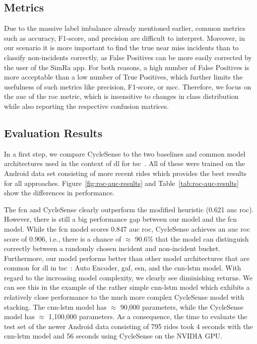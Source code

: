 \subsection{Metrics}
\label{subsec:metrics}
Due to the massive label imbalance already mentioned earlier, common metrics such as accuracy, F1-score, and precision are difficult to interpret.
Moreover, in our scenario it is more important to find the true near miss incidents than to classify non-incidents correctly, as False Positives can be more easily corrected by the user of the SimRa app.
For both reasons, a high number of False Positives is more acceptable than a low number of True Positives, which further limits the usefulness of such metrics like precision, F1-score, or \ac{mcc}.
Therefore, we focus on the \ac{auc} of the \ac{roc} metric, which is insensitive to changes in class distribution~\cite{fawcett2006introduction} while also reporting the respective confusion matrices.

\subsection{Evaluation Results}
\label{subsec:evaluation_results}
In a first step, we compare CycleSense to the two baselines and common model architectures used in the context of \ac{dl} for \ac{tsc}~\cite{ismail2019deep}.
All of these were trained on the Android data set consisting of more recent rides which provides the best results for all approaches.
Figure~\ref{fig:roc-auc-results} and Table~\ref{tab:roc-auc-results} show the differences in performance.

The \ac{fcn} and CycleSense clearly outperform the modified heuristic (0.621 \ac{auc} \ac{roc}).
However, there is still a big performance gap between our model and the \ac{fcn} model.
While the \ac{fcn} model scores 0.847 \ac{auc} \ac{roc}, CycleSense achieves an \ac{auc} \ac{roc} score of 0.906, i.e., there is a chance of $\approx$ 90.6\% that the model can distinguish correctly between a randomly chosen incident and non-incident bucket.
Furthermore, our model performs better than other model architectures that are common for \ac{dl} in \ac{tsc}~\cite{ismail2019deep}: Auto Encoder, \ac{gaf}, \ac{esn}, and the \ac{cnn}-\ac{lstm} model.
With regard to the increasing model complexity, we clearly see diminishing returns.
We can see this in the example of the rather simple \ac{cnn}-\ac{lstm} model which exhibits a relatively close performance to the much more complex CycleSense model with stacking.
The \ac{cnn}-\ac{lstm} model has $\approx$ 90,000 parameters, while the CycleSense model has $\approx$ 1,100,000 parameters.
As a consequence, the time to evaluate the test set of the newer Android data consisting of 795 rides took 4 seconds with the \ac{cnn}-\ac{lstm} model and 56 seconds using CycleSense on the NVIDIA GPU.

